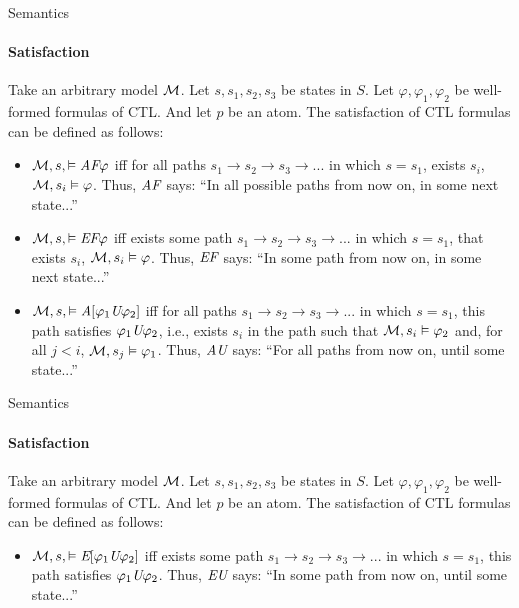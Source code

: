 \begin{frame}{Semantics}
	\framesubtitle{Satisfaction}
	Take an arbitrary model $\mathcal{M}$. Let $s, s_1, s_2, s_3$ be states in $S$. Let $\varphi, \varphi_1, \varphi_2$ be well-formed formulas of CTL. And let $p$ be an atom. The satisfaction of CTL formulas can be defined as follows:
	\begin{itemize}
		\item $\mathcal{M},s, \vDash \textit{A}\textit{F} \varphi$ iff for all paths $s_1 \to s_2 \to s_3 \to ...$ in which $s = s_1$, exists $s_i$, $\mathcal{M}, s_i \vDash \varphi$. Thus, $\textit{A}\textit{F}$ says: ``In all possible paths from now on, in some next state...''\pause
		\item $\mathcal{M},s, \vDash \textit{E}\textit{F} \varphi$ iff exists some path $s_1 \to s_2 \to s_3 \to ...$ in which $s = s_1$, that exists $s_i$, $\mathcal{M}, s_i \vDash \varphi$. Thus, $\textit{E}\textit{F}$ says: ``In some path from now on, in some next state...''\pause
		\item $\mathcal{M},s, \vDash \textit{A}[\varphi_1 \textit{U} \varphi_2]$ iff for all paths $s_1 \to s_2 \to s_3 \to ...$ in which $s = s_1$, this path satisfies $\varphi_1 \textit{U} \varphi_2$, i.e., exists $s_i$ in the path such that $\mathcal{M}, s_i \vDash \varphi_2$ and, for all $j < i$, $\mathcal{M}, s_j \vDash \varphi_1$. Thus, $\textit{A}\textit{U}$ says: ``For all paths from now on, until some state...''
	\end{itemize}
\end{frame}
\begin{frame}{Semantics}
    \framesubtitle{Satisfaction}
    Take an arbitrary model $\mathcal{M}$. Let $s, s_1, s_2, s_3$ be states in $S$. Let $\varphi, \varphi_1, \varphi_2$ be well-formed formulas of CTL. And let $p$ be an atom. The satisfaction of CTL formulas can be defined as follows:
    \begin{itemize}
        \item $\mathcal{M},s, \vDash \textit{E}[\varphi_1 \textit{U} \varphi_2]$ iff exists some path $s_1 \to s_2 \to s_3 \to ...$ in which $s = s_1$, this path satisfies $\varphi_1 \textit{U} \varphi_2$. Thus, $\textit{E}\textit{U}$ says: ``In some path from now on, until some state...''
    \end{itemize}
\end{frame}